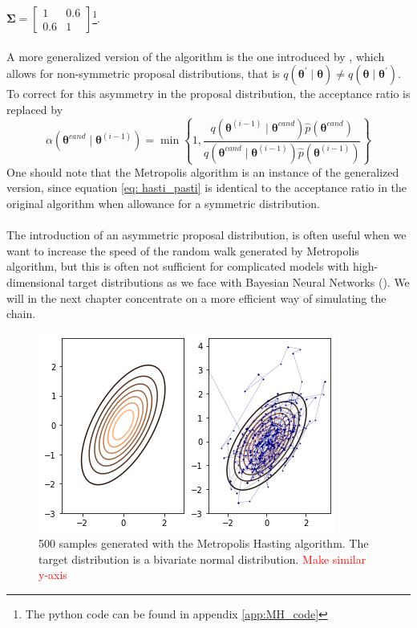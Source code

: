 $\boldsymbol{\Sigma}=\left[\begin{array}{cc}
1 & 0.6\\
0.6 & 1
\end{array}\right]$\footnote{The python code can be found in appendix \ref{app:MH_code}}. \\
\\
A more generalized version of the algorithm is the one introduced by \cite{hastings70}, which allows for non-symmetric proposal distributions, that is $q(\boldsymbol{\theta}^\prime\mid \boldsymbol{\theta}) \neq q(\boldsymbol{\theta}\mid \boldsymbol{\theta}^\prime)$. To correct for this asymmetry in the proposal distribution, the acceptance ratio is replaced by
\begin{equation}\label{eq: hasti_pasti}
\alpha\left(\boldsymbol{\theta}^{c a n d} \mid \boldsymbol{\theta}^{(i-1)}\right)=\min \left\{1, \frac{q\left(\boldsymbol{\theta}^{(i-1)} \mid \boldsymbol{\theta}^{c a n d}\right) \hat{p}\left(\boldsymbol{\theta}^{c a n d}\right)}{q\left(\boldsymbol{\theta}^{c a n d} \mid \boldsymbol{\theta}^{(i-1)}\right) \hat{p}\left(\boldsymbol{\theta}^{(i-1)}\right)}\right\} 
\end{equation}
One should note that the Metropolis algorithm is an instance of the generalized version, since equation \ref{eq: hasti_pasti} is identical to the acceptance ratio in the original algorithm when allowance for a symmetric distribution. \\
\\
The introduction of an asymmetric proposal distribution, is often useful when we want to increase the speed of the random walk generated by Metropolis algorithm, but this is often not sufficient for complicated models with high-dimensional target distributions as we face with Bayesian Neural Networks (\cite{gelmanbda04}). We will in the next chapter concentrate on a more efficient way of simulating the chain.
\begin{figure}
    \centering
    \includegraphics{pics/mh_randomWalk_behavior.png}
    \caption{500 samples generated with the Metropolis Hasting algorithm. The target distribution is a bivariate normal distribution. \textcolor{red}{Make similar y-axis}}
    \label{fig:MH_sampling}
\end{figure}
\clearpage
